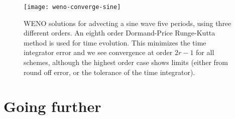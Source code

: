\begin{figure}[t]
\centering
\texttt{[image: weno-converge-sine]}
\caption[Very high order WENO convergence rates for linear advection]
{\label{fig:weno-converge-sine} WENO solutions for advecting a sine wave five periods, using three different orders. An eighth order Dormand-Price Runge-Kutta method is used for time evolution. This minimizes the time integrator error and we see convergence at order $2 r - 1$ for all schemes, although the highest order case shows limits (either from round off error, or the tolerance of the time integrator). \\
}
\end{figure}
%


\section{Going further}

